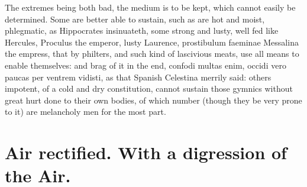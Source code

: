 {The extremes being both bad, the medium is to be kept, which
cannot easily be determined. Some are better able to sustain, such as
are hot and moist, phlegmatic, as Hippocrates insinuateth, some strong
and lusty, well fed like Hercules,  Proculus the emperor,
lusty Laurence, prostibulum faeminae Messalina the empress, that
by philters, and such kind of lascivious meats, use all means to
enable themselves: and brag of it in the end, confodi multas
enim, occidi vero paucas per ventrem vidisti, as that Spanish
Celestina merrily said: others impotent, of a cold and dry
constitution, cannot sustain those gymnics without great hurt done to
their own bodies, of which number (though they be very prone to it) are
melancholy men for the most part.


\section{Air rectified. With a digression of the Air.}

}
